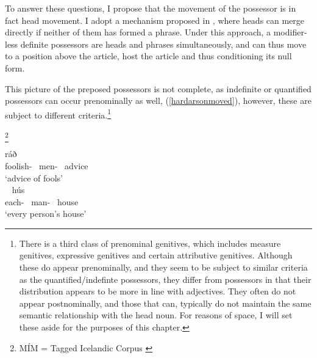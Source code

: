 \documentclass[output=paper,colorlinks,citecolor=brown,
]{langscibook}
\begin{document}
To answer these questions, I propose that the movement of the possessor is in fact head movement. I adopt a mechanism proposed in \cite{hardarson2020}, where heads can merge directly if neither of them has formed a phrase. Under this approach, a modifier-less definite possessors are heads and phrases simultaneously, and can thus move to a position above the article, host the article and thus conditioning its null form.

This picture of the preposed possessors is not complete, as indefinite or quantified possessors can occur prenominally as well, (\ref{hardarsonmoved}), however, these are subject to different criteria.\footnote{There is a third class of prenominal genitives, which includes measure genitives, expressive genitives and certain attributive genitives. Although these do appear prenominally, and they seem to be subject to similar criteria as the quantified/indefinte possessors, they differ from possessors in that their distribution appears to be more in line with adjectives. They often do not appear postnominally, and those that can, typically do not maintain the same semantic relationship with the head noun. For reasons of space, I will set these aside for the purposes of this chapter.}

\begin{exe}
		\begin{multicols}{2}
	\ex	{[MÍM]}\footnote{M{\'I}M = Tagged Icelandic Corpus \citep{helgadottir2012}} \label{hardarsonmoved} %
		\begin{xlist}
			\ex	{} ráð\\
						foolish-\hardGen~ men-\hardGen~ advice\\
				\glt	`advice of fools'\\~
			\ex	\gll	[hver-s mann-s] hús\\
						each-\hardGen~ man-\hardGen~ house\\
				\glt	`every person's house'
		\end{xlist}
				\end{multicols}
\end{exe}
\end{document}
